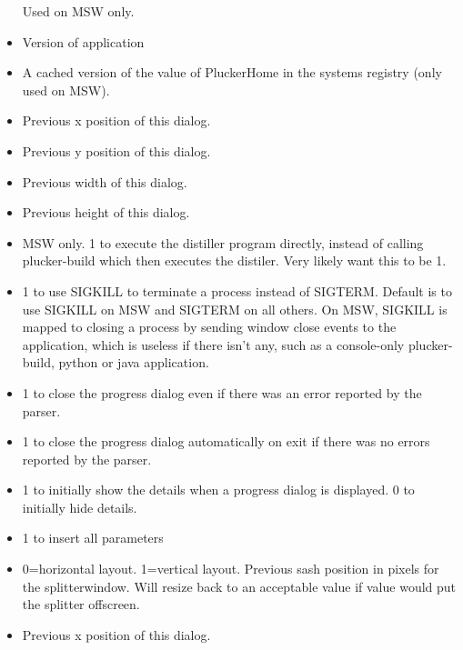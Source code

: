 \begin{helponly}
\begin{itemize}
    Used on MSW only.
  \item {} Version of \brandingapplicationdesktopname application
  \item {} A cached version of the value of PluckerHome in the
    systems registry (only used on MSW).
  \item {} Previous x position of this dialog.
  \item {} Previous y position of this dialog.
  \item {} Previous width of this dialog.
  \item {} Previous height of this dialog.
  \item {} MSW only. 1 to execute the distiller 
    program directly, instead of calling plucker-build which then executes the
    distiler. Very likely want this to be 1. 
  \item {} 1 to use SIGKILL to terminate a process
    instead of SIGTERM. Default is to use SIGKILL on MSW and SIGTERM on all others. 
    On MSW, SIGKILL is mapped to closing a process by sending window close events to 
    the application, which is useless if there isn't any, such as a console-only 
    plucker-build, python or java application.
  \item {} 1 to close the progress dialog
    even if there was an error reported by the parser.
  \item {} 1 to close the progress dialog
    automatically on exit if there was no errors reported by the parser.
  \item {} 1 to initially show the details
    when a progress dialog is displayed. 0 to initially hide details.
  \item {} 1 to insert all parameters
  \item {} 0=horizontal layout. 1=vertical layout.
   Previous
    sash position in pixels for the splitterwindow. Will resize back to an
    acceptable value if value would put the splitter offscreen.
  \item {} Previous x position of this dialog.

\end{itemize}
\end{helponly}
